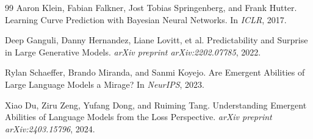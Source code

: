 \documentclass[10pt]{article}
\begin{document}
\begin{thebibliography}{99}
Aaron Klein, Fabian Falkner, Jost Tobias Springenberg, and Frank Hutter.
\newblock Learning Curve Prediction with Bayesian Neural Networks.
\newblock In \emph{ICLR}, 2017.

Deep Ganguli, Danny Hernandez, Liane Lovitt, et al.
\newblock Predictability and Surprise in Large Generative Models.
\newblock \emph{arXiv preprint arXiv:2202.07785}, 2022.

Rylan Schaeffer, Brando Miranda, and Sanmi Koyejo.
\newblock Are Emergent Abilities of Large Language Models a Mirage?
\newblock In \emph{NeurIPS}, 2023.

Xiao Du, Ziru Zeng, Yufang Dong, and Ruiming Tang.
\newblock Understanding Emergent Abilities of Language Models from the Loss Perspective.
\newblock \emph{arXiv preprint arXiv:2403.15796}, 2024.

\end{thebibliography}
\end{document}
